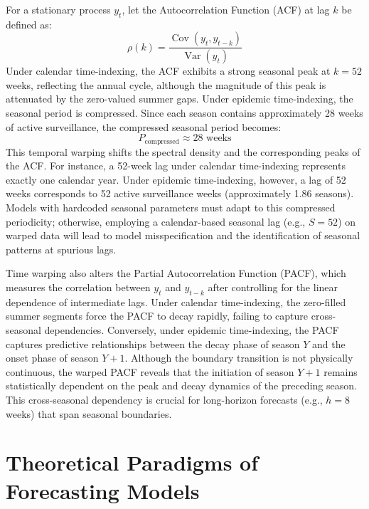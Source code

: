For a stationary process $y_t$, let the Autocorrelation Function (ACF) at lag $k$ be defined as:
\begin{equation}
\rho(k) = \frac{\operatorname{Cov}(y_t, y_{t-k})}{\operatorname{Var}(y_t)}
\end{equation}
Under calendar time-indexing, the ACF exhibits a strong seasonal peak at $k = 52$ weeks, reflecting the annual cycle, although the magnitude of this peak is attenuated by the zero-valued summer gaps. Under epidemic time-indexing, the seasonal period is compressed. Since each season contains approximately 28 weeks of active surveillance, the compressed seasonal period becomes:
\begin{equation}
P_{\text{compressed}} \approx 28 \text{ weeks}
\end{equation}
This temporal warping shifts the spectral density and the corresponding peaks of the ACF. For instance, a 52-week lag under calendar time-indexing represents exactly one calendar year. Under epidemic time-indexing, however, a lag of 52 weeks corresponds to 52 active surveillance weeks (approximately 1.86 seasons). Models with hardcoded seasonal parameters must adapt to this compressed periodicity; otherwise, employing a calendar-based seasonal lag (e.g., $S=52$) on warped data will lead to model misspecification and the identification of seasonal patterns at spurious lags.

Time warping also alters the Partial Autocorrelation Function (PACF), which measures the correlation between $y_t$ and $y_{t-k}$ after controlling for the linear dependence of intermediate lags. Under calendar time-indexing, the zero-filled summer segments force the PACF to decay rapidly, failing to capture cross-seasonal dependencies. Conversely, under epidemic time-indexing, the PACF captures predictive relationships between the decay phase of season $Y$ and the onset phase of season $Y+1$. Although the boundary transition is not physically continuous, the warped PACF reveals that the initiation of season $Y+1$ remains statistically dependent on the peak and decay dynamics of the preceding season. This cross-seasonal dependency is crucial for long-horizon forecasts (e.g., $h=8$ weeks) that span seasonal boundaries.


\section{Theoretical Paradigms of Forecasting Models}

